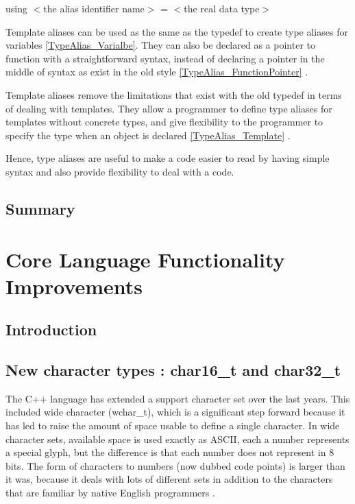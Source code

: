 \documentclass[11pt]{report}
\begin{document}
\begin{center}
using $<$the alias identifier name$>$ = $<$the real data type$>$
\end{center}

Template aliases can be used as the same as the typedef to create type aliases for variables \ref{TypeAlias_Varialbe}. They can also be declared as a pointer to function with a straightforward syntax, instead of declaring a pointer in the middle of syntax as exist in the old style \ref{TypeAlias_FunctionPointer} \cite{Gregorie:professionalcpp}.
\newline

Template aliases remove the limitations that exist with the old typedef in terms of dealing with templates. They allow a programmer to define type aliases for templates without concrete types, and give flexibility to the programmer to specify the type when an object is declared \ref{TypeAlias_Template} \cite{Gregorie:professionalcpp}.
\newline

Hence, type aliases are useful to make a code easier to read by having simple syntax and also provide flexibility to deal with a code.

\section{Summary}
\label{sect: Summary}


\chapter{Core Language Functionality Improvements}
\label{chapter: Functionality Improvements}

\section{Introduction}
\label{section1: Introduction}

\section{New character types : char16\_t and char32\_t}
\label{section: char16_t and char32_t}
The C++ language has extended a support character set over the last years. This included wide character (wchar\_t), which is a significant step forward because it has led to raise the amount of space usable to define a single character. In wide character sets, available space is used exactly as ASCII, each a number represents a special glyph, but the difference is that each number does not represent in 8 bits. The form of characters to numbers (now dubbed code points) is larger than it was, because it deals with lots of different sets in addition to the characters that are familiar by native English programmers \cite{Gregorie:professionalcpp}.
\newline
\end{document}
